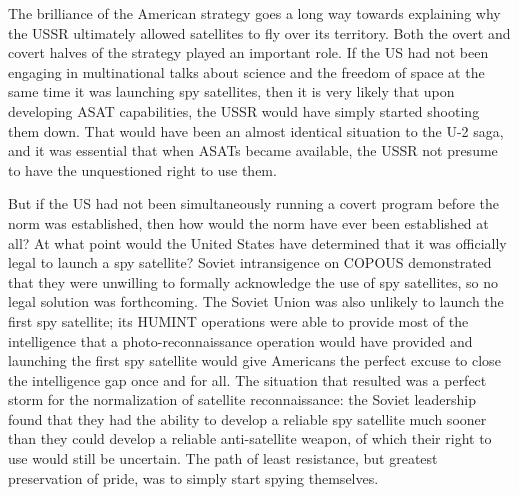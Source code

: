 \documentclass{memoir}
\begin{document}
The brilliance of the American strategy goes a long way towards explaining why the USSR ultimately allowed satellites to fly over its territory. Both the overt and covert halves of the strategy played an important role. If the US had not been engaging in multinational talks about science and the freedom of space at the same time it was launching spy satellites, then it is very likely that upon developing ASAT capabilities, the USSR would have simply started shooting them down. That would have been an almost identical situation to the U-2 saga, and it was essential that when ASATs became available, the USSR not presume to have the unquestioned right to use them.

But if the US had not been simultaneously running a covert program before the norm was established, then how would the norm have ever been established at all? At what point would the United States have determined that it was officially legal to launch a spy satellite? Soviet intransigence on COPOUS demonstrated that they were unwilling to formally acknowledge the use of spy satellites, so no legal solution was forthcoming. The Soviet Union was also unlikely to launch the first spy satellite; its HUMINT operations were able to provide most of the intelligence that a photo-reconnaissance operation would have provided and launching the first spy satellite would give Americans the perfect excuse to close the intelligence gap once and for all. The situation that resulted was a perfect storm for the normalization of satellite reconnaissance: the Soviet leadership found that they had the ability to develop a reliable spy satellite much sooner than they could develop a reliable anti-satellite weapon, of which their right to use would still be uncertain. The path of least resistance, but greatest preservation of pride, was to simply start spying themselves.
\end{document}

